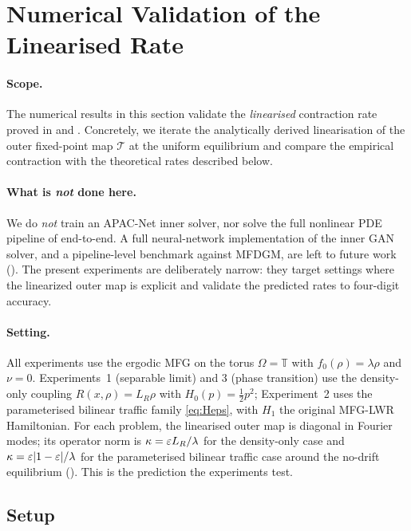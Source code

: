 \section{Numerical Validation of the Linearised Rate}
\label{sec:experiments}

\paragraph{Scope.}
The numerical results in this section validate the \emph{linearised}
contraction rate proved in  and
.  Concretely, we iterate the analytically
derived linearisation of the outer fixed-point map $\mathcal{T}$ at the
uniform equilibrium and compare the empirical contraction with the
theoretical rates described below.

\paragraph{What is \emph{not} done here.}
We do \emph{not} train an APAC-Net inner solver, nor solve the full
nonlinear PDE pipeline of  end-to-end.  A full
neural-network implementation of the inner GAN solver, and a
pipeline-level benchmark against MFDGM, are left to future work
().  The present experiments are deliberately
narrow: they target settings where the linearized outer map is explicit
and validate the predicted rates to four-digit accuracy.

\paragraph{Setting.}
All experiments use the ergodic MFG on the torus
$\Omega = \mathbb{T}$ with $f_0(\rho) = \lambda\rho$ and $\nu = 0$.
Experiments~1 (separable limit) and 3 (phase transition) use
the density-only coupling $R(x,\rho) = L_R\rho$ with
$H_0(p) = \tfrac{1}{2}p^2$;
Experiment~2 uses the parameterised bilinear traffic family
\eqref{eq:Heps}, with $H_1$ the original MFG-LWR Hamiltonian.
For each problem, the linearised outer map is diagonal in Fourier modes;
its operator norm is $\kappa = \varepsilon L_R/\lambda$ for the density-only
case and $\kappa = \varepsilon|1-\varepsilon|/\lambda$ for the parameterised bilinear
traffic case around the no-drift equilibrium ().
This is the prediction the experiments test.

\subsection{Setup}

